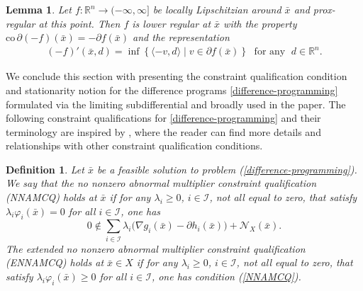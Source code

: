 \documentclass[11pt,a4paper]{article}
\newtheorem{lemma}[theorem]{Lemma}
\newtheorem{definition}[theorem]{Definition}
\theoremstyle{plain}
\begin{document}
\begin{lemma}\label{minus prox regular}
Let $f:\mathbb{R}^n\to(-\infty,\infty]$ be locally Lipschitzian around $\bar x$ and prox-regular at this point. Then $f$ is lower regular at $\bar x$ with the property $\mathrm{co}\,\partial(-f)(\bar x) = -\partial f(\bar x)$ and the representation
\begin{equation*}
\begin{aligned}
(-f)'(\bar x,d) = \inf\left\{\langle -v,d \rangle \mid v \in \partial f(\bar x)\right\}\;\mbox{ for any }\;d\in\mathbb{R}^n.
\end{aligned}
\end{equation*}
\end{lemma}

We conclude this section with presenting the constraint qualification condition and stationarity notion for the difference programs \eqref{difference-programming} formulated via the limiting subdifferential and broadly used in the paper. The following constraint qualifications for \eqref{difference-programming}  and their terminology are inspired by \cite{xu2015smoothing, ye2000constraint}, where the reader can find more details and relationships with other constraint qualification conditions.

\begin{definition}\label{def:NNAMCQandENNAMCQ}
Let $\bar{x}$ be a feasible solution to problem (\ref{difference-programming}).
We say that the {\em no nonzero abnormal multiplier constraint qualification} (NNAMCQ) holds at $\bar{x}$ if for any $\lambda_i \geq 0$, $i \in \mathcal{I}$, not all equal to zero, that satisfy $\lambda_i \varphi_i(\bar{x}) = 0$ for all $i \in \mathcal{I}$, one has
\begin{equation}\label{NNAMCQ}
0\notin \sum_{i\in\mathcal{I}} \lambda_i \big(\nabla g_i(\bar x)-\partial h_i(\bar{x})\big)+\mathcal N_X(\bar x).
\end{equation}
The {\em extended no nonzero abnormal multiplier constraint qualification} (ENNAMCQ) holds at $\bar{x}\in X$ if for any $\lambda_i\geq0$, $i\in\mathcal{I}$, not all equal to zero, that satisfy $\lambda_i\varphi_i(\bar x) \geq 0$ for all $i\in\mathcal{I}$, one has condition (\ref{NNAMCQ}).
\end{definition}
\end{document}
